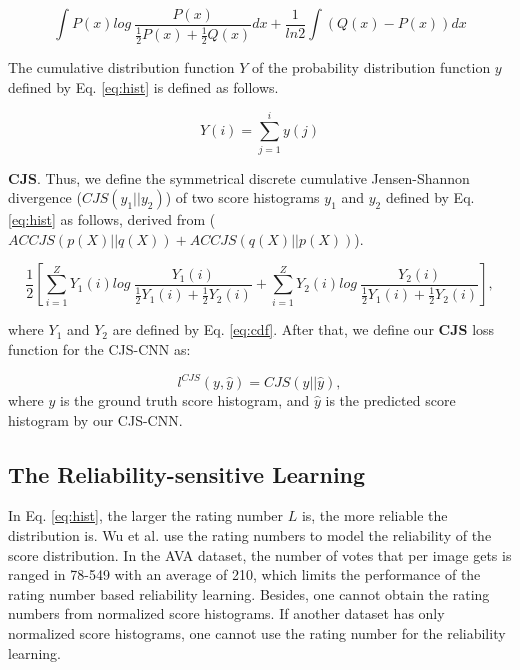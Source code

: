 \documentclass[letterpaper]{article} %
\begin{document}
\begin{small}
\begin{equation}
\int P(x)log~\frac{P(x)}{\frac{1}{2}P(x)+\frac{1}{2}Q(x)}dx + \frac{1}{ln2} \int (Q(x)-P(x))dx
\end{equation}
\label{eq:ASCJS}
\end{small}

The cumulative distribution function $Y$ of the probability distribution function $y$ defined by Eq. \ref{eq:hist} is defined as follows.

\begin{equation}
Y(i) = \sum_{j=1}^{i} y(j)
\label{eq:cdf}
\end{equation}

\textbf{CJS}. Thus, we define the symmetrical discrete cumulative Jensen-Shannon divergence ($CJS(y_1||y_2)$) of two score histograms $y_1$ and $y_2$ defined by Eq. \ref{eq:hist} as follows, derived from ($ACCJS(p(X)||q(X))+ACCJS(q(X)||p(X))$).

\begin{small}
\begin{equation}
\frac{1}{2}
[
\sum_{i=1}^{Z}Y_1(i)log~\frac{Y_1(i)}{\frac{1}{2}Y_1(i)+\frac{1}{2}Y_2(i)} 
+ 
\sum_{i=1}^{Z}Y_2(i)log~\frac{Y_2(i)}{\frac{1}{2}Y_1(i)+\frac{1}{2}Y_2(i)}
], 
\end{equation}
\end{small}
\label{eq:D-CJS}
where $Y_1$ and $Y_2$ are defined by Eq. \ref{eq:cdf}. After that, we define our \textbf{CJS} loss function for the CJS-CNN as:

\begin{equation}
l^{CJS}(y,\hat{y}) = CJS(y||\hat{y}),
\label{eq:CJS}
\end{equation}
where $y$ is the ground truth score histogram, and $\hat{y}$ is the predicted score histogram by our CJS-CNN.

\subsection{The Reliability-sensitive Learning}
In Eq. \ref{eq:hist}, the larger the rating number $L$ is, the more reliable the distribution is. Wu et al. \cite{WuICCV2011} use the rating numbers to model the reliability of the score distribution. In the AVA dataset, the number of votes that per image gets is ranged in 78-549 with an average of 210, which limits the performance of the rating number based reliability learning. Besides, one cannot obtain the rating numbers from normalized score histograms. If another dataset has only normalized score histograms, one cannot use the rating number for the reliability learning.
\end{document}
